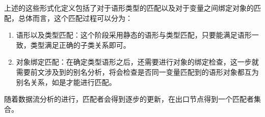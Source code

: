 \begin{center}
\DP
\end{center}

\begin{center}
\DP
\end{center}

\begin{center}
\DP
\end{center}

\begin{center}
\DP
\end{center}

上述的这些形式化定义包括了对于语形类型的匹配以及对于变量之间绑定对象的匹配，总体而言，这个匹配过程可以分为：
\begin{enumerate}
\item 语形以及类型匹配：这个阶段采用静态的语形与类型匹配，只要能满足语形一致，类型满足正确的子类关系即可。
\item 对象绑定匹配：在确定类型语形之后，还需要进行对象的绑定检查，这一步就需要前文涉及到的别名分析，将会检查是否同一变量匹配到的语形对象都互为别名关系，如是才能进行匹配。
\end{enumerate}

随着数据流分析的进行，匹配者会得到逐步的更新，在出口节点得到一个匹配者集合。

